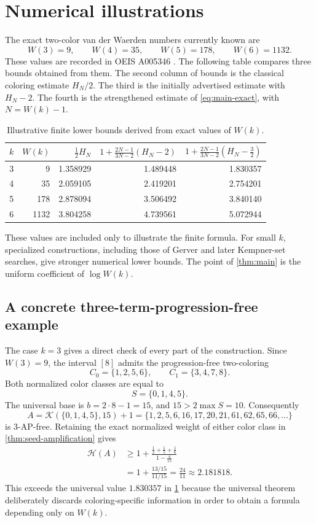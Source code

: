 \documentclass[11pt]{article}
\theoremstyle{definition}
\theoremstyle{remark}
\newcommand{\HH}{\mathcal{H}}
\newcommand{\Kemp}{\mathcal{K}}
\begin{document}
\section{Numerical illustrations}

The exact two-color van der Waerden numbers currently known are
\[
 W(3)=9,\qquad W(4)=35,\qquad W(5)=178,\qquad W(6)=1132.
\]
These values are recorded in OEIS A005346 \cite{oeis-a005346}.  The following
table compares three bounds obtained from them.  The second column of bounds is the classical coloring
estimate $H_N/2$.  The third is the initially advertised estimate with
$H_N-2$.  The fourth is the strengthened estimate of
\cref{eq:main-exact}, with $N=W(k)-1$.

\begin{table}[ht]
\centering
\caption{Illustrative finite lower bounds derived from exact values of $W(k)$.}
\label{tab:numerics}
\begin{tabular}{@{}c r r r r@{}}
\toprule
$k$ & $W(k)$ & $\tfrac12 H_N$ &
$1+\frac{2N-1}{3N-2}(H_N-2)$ &
$1+\frac{2N-1}{3N-2}(H_N-\tfrac32)$ \\
\midrule
3 & 9    & 1.358929 & 1.489448 & 1.830357 \\
4 & 35   & 2.059105 & 2.419201 & 2.754201 \\
5 & 178  & 2.878094 & 3.506492 & 3.840140 \\
6 & 1132 & 3.804258 & 4.739561 & 5.072944 \\
\bottomrule
\end{tabular}
\end{table}

These values are included only to illustrate the finite formula.  For small
$k$, specialized constructions, including those of Gerver and later
Kempner-set searches, give stronger numerical lower bounds.  The point of
\cref{thm:main} is the uniform coefficient of $\log W(k)$.

\subsection{A concrete three-term-progression-free example}

The case $k=3$ gives a direct check of every part of the construction.  Since
$W(3)=9$, the interval $[8]$ admits the progression-free two-coloring
\[
 C_0=\{1,2,5,6\},
 \qquad
 C_1=\{3,4,7,8\}.
\]
Both normalized color classes are equal to
\[
 S=\{0,1,4,5\}.
\]
The universal base is $b=2\cdot8-1=15$, and $15>2\max S=10$.
Consequently
\[
 A=\Kemp(\{0,1,4,5\},15)+1
   =\{1,2,5,6,16,17,20,21,61,62,65,66,\ldots\}
\]
is $3$-AP-free.  Retaining the exact normalized weight of either color class
in \cref{thm:seed-amplification} gives
\begin{align*}
 \HH(A)
 &\ge
 1+\frac{\frac12+\frac15+\frac16}{1-\frac4{15}}\\
 &=1+\frac{13/15}{11/15}
 =\frac{24}{11}
 \approx 2.181818.
\end{align*}
This exceeds the universal value $1.830357$ in \cref{tab:numerics} because
the universal theorem deliberately discards coloring-specific information in
order to obtain a formula depending only on $W(k)$.
\end{document}

